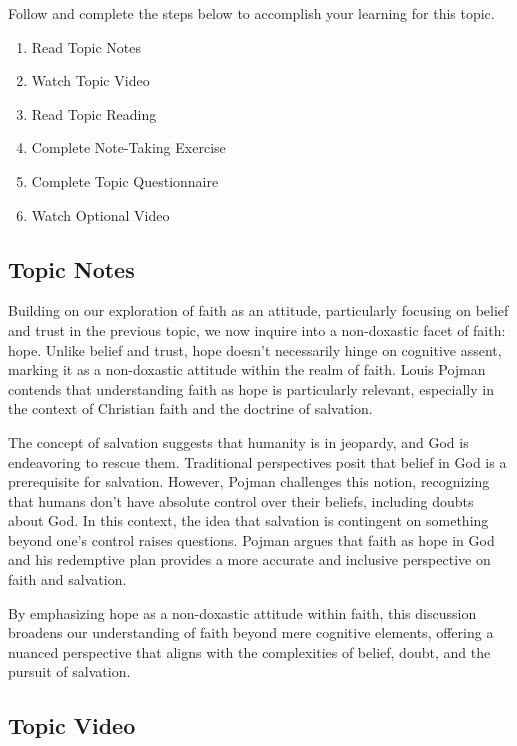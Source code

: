 \documentclass[
]{book}
\providecommand{\tightlist}{%
  \setlength{\itemsep}{0pt}\setlength{\parskip}{0pt}}
\begin{document}
Follow and complete the steps below to accomplish your learning for this topic.

\begin{enumerate}
\def\labelenumi{\arabic{enumi}.}
\tightlist
\item
  Read Topic Notes
\item
  Watch Topic Video
\item
  Read Topic Reading
\item
  Complete Note-Taking Exercise
\item
  Complete Topic Questionnaire
\item
  Watch Optional Video
\end{enumerate}

\hypertarget{topic-notes-5}{%
\subsection*{Topic Notes}\label{topic-notes-5}}

Building on our exploration of faith as an attitude, particularly focusing on belief and trust in the previous topic, we now inquire into a non-doxastic facet of faith: hope. Unlike belief and trust, hope doesn't necessarily hinge on cognitive assent, marking it as a non-doxastic attitude within the realm of faith. Louis Pojman contends that understanding faith as hope is particularly relevant, especially in the context of Christian faith and the doctrine of salvation.

The concept of salvation suggests that humanity is in jeopardy, and God is endeavoring to rescue them. Traditional perspectives posit that belief in God is a prerequisite for salvation. However, Pojman challenges this notion, recognizing that humans don't have absolute control over their beliefs, including doubts about God. In this context, the idea that salvation is contingent on something beyond one's control raises questions. Pojman argues that faith as hope in God and his redemptive plan provides a more accurate and inclusive perspective on faith and salvation.

By emphasizing hope as a non-doxastic attitude within faith, this discussion broadens our understanding of faith beyond mere cognitive elements, offering a nuanced perspective that aligns with the complexities of belief, doubt, and the pursuit of salvation.

\hypertarget{topic-video-5}{%
\subsection*{Topic Video}\label{topic-video-5}}
\end{document}
